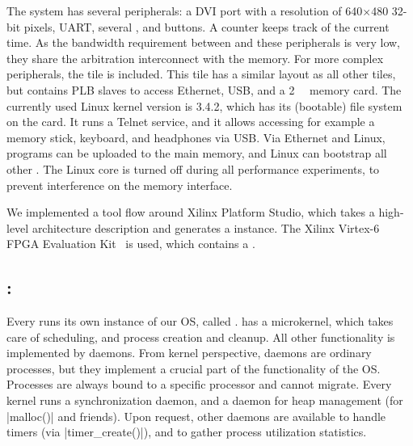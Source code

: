 The system has several peripherals: a \ac{DVI} port with a resolution of 640$\times$480 32-bit pixels, \ac{UART}, several , and buttons.
A counter keeps track of the current time.
As the bandwidth requirement between \MicroBlazes and these peripherals is very low, they share the arbitration interconnect with the memory.
For more complex peripherals, the  tile is included.
This tile has a similar layout as all other tiles, but contains \ac{PLB} slaves to access Ethernet, \ac{USB}, and a \SI{2}{\giga\byte} \CompactFlash memory card.
The currently used Linux kernel version is 3.4.2, which has its (bootable) file system on the \CompactFlash card.
It runs a Telnet service, and it allows accessing for example a memory stick, keyboard, and headphones via \ac{USB}.
Via Ethernet and Linux, programs can be uploaded to the main memory, and Linux can bootstrap all other \MicroBlazes.
The Linux core is turned off during all performance experiments, to prevent interference on the memory interface.

We implemented a tool flow around Xilinx Platform Studio, which takes a high-level architecture description and generates a \Starburst instance.
The Xilinx Virtex-6 \ac{FPGA}  Evaluation Kit~\cite{ml605} is used, which contains a  .


\subsection{: \Helix}
\label{s:starburst:helix}

Every \MicroBlaze runs its own instance of our \ac{OS}, called \Helix*.
\Helix has a microkernel, which takes care of scheduling, and process creation and cleanup.
All other functionality is implemented by daemons.
From kernel perspective, daemons are ordinary processes, but they implement a crucial part of the functionality of the \ac{OS}.
Processes are always bound to a specific processor and cannot migrate.
Every kernel runs a synchronization daemon, and a daemon for heap management (for \lsticode|malloc()| and friends).
Upon request, other daemons are available to handle timers (via \lsticode|timer_create()|), and to gather process utilization statistics.

